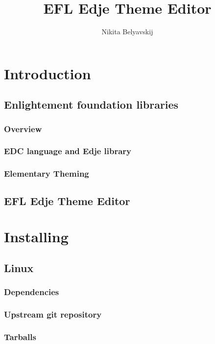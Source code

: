 \documentclass[titlepage,oneside,11pt]{book}
\author{Nikita Belyavskij}
\title{EFL Edje Theme Editor}
\begin{document}
\maketitle
\tableofcontents
\chapter{Introduction}
\section{Enlightement foundation libraries}
\subsection{Overview}
\subsection{EDC language and Edje library}
\subsection{Elementary Theming}
\newpage
\section{EFL Edje Theme Editor}
\chapter{Installing}
\section{Linux}
\subsection{Dependencies}
\subsection{Upstream git repository}
\subsection{Tarballs}
\end{document}
